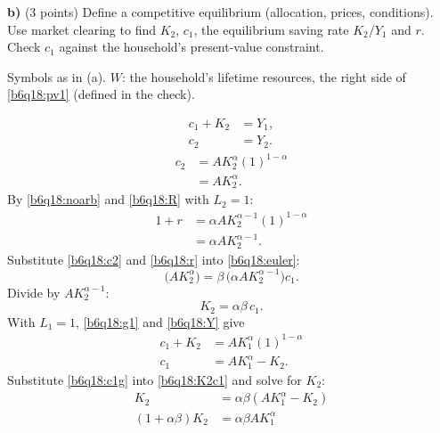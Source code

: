 \textbf{b)} (3 points) Define a competitive equilibrium (allocation, prices, conditions). Use market clearing to find $K_2$, $c_1$,
the equilibrium saving rate $K_2/Y_1$ and $r$. Check $c_1$ against the household's present-value constraint.
\resolespaco
\begin{sol}
\begin{notacao}
\item Symbols as in (a). $W$: the household's lifetime resources, the right side of \eqref{b6q18:pv1} (defined in the check).
\end{notacao}
\begin{align}
c_1+K_2&=Y_1, \label{b6q18:g1}\\
c_2&=Y_2. \label{b6q18:g2}
\end{align}
\begin{align}
c_2&=AK_2^\alpha(1)^{1-\alpha}\nonumber\\
&=AK_2^\alpha. \label{b6q18:c2}
\end{align}
By \eqref{b6q18:noarb} and \eqref{b6q18:R} with $L_2=1$:
\begin{align}
1+r&=\alpha AK_2^{\alpha-1}(1)^{1-\alpha}\nonumber\\
&=\alpha AK_2^{\alpha-1}. \label{b6q18:r}
\end{align}
Substitute \eqref{b6q18:c2} and \eqref{b6q18:r} into \eqref{b6q18:euler}:
\[
\big(AK_2^\alpha\big)=\beta\,\big(\alpha AK_2^{\alpha-1}\big)c_1 .
\]
Divide by $AK_2^{\alpha-1}$:
\begin{equation}
K_2=\alpha\beta\,c_1. \label{b6q18:K2c1}
\end{equation}
With $L_1=1$, \eqref{b6q18:g1} and \eqref{b6q18:Y} give
\begin{align}
c_1+K_2&=AK_1^\alpha(1)^{1-\alpha}\nonumber\\
c_1&=AK_1^\alpha-K_2. \label{b6q18:c1g}
\end{align}
Substitute \eqref{b6q18:c1g} into \eqref{b6q18:K2c1} and solve for $K_2$:
\begin{align}
K_2&=\alpha\beta(AK_1^\alpha-K_2)\nonumber\\
(1+\alpha\beta)K_2&=\alpha\beta AK_1^\alpha\nonumber\\

\end{align}
\end{sol}
